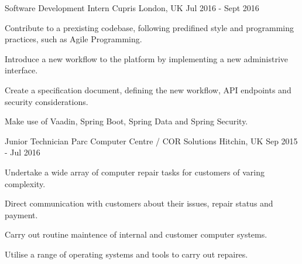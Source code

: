

\begin{cventries}

  \cventry
    {Software Development Intern} %
    {Cupris} %
    {London, UK} %
    {Jul 2016 - Sept 2016} %
    {
      \begin{cvitems} %
        \item {Contribute to a prexisting codebase, following predifined style and programming practices, such as Agile Programming.}
        \item {Introduce a new workflow to the platform by implementing a new administrive interface.}
        \item {Create a specification document, defining the new workflow, API endpoints and security considerations.}
	\item {Make use of Vaadin, Spring Boot, Spring Data and Spring Security.}
      \end{cvitems}
    }

  \cventry
    {Junior Technician} %
    {Parc Computer Centre / COR Solutions} %
    {Hitchin, UK} %
    {Sep 2015 - Jul 2016} %
    {
      \begin{cvitems} %
        \item {Undertake a wide array of computer repair tasks for customers of varing complexity.}
        \item {Direct communication with customers about their issues, repair status and payment.}
        \item {Carry out routine maintence of internal and customer computer systems.}
	\item {Utilise a range of operating systems and tools to carry out repaires.}
      \end{cvitems}
    }
\end{cventries}
